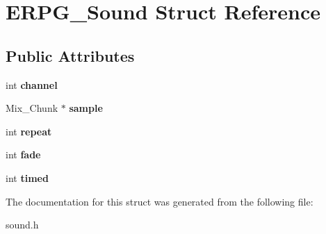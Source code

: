 \hypertarget{structERPG__Sound}{\section{E\-R\-P\-G\-\_\-\-Sound Struct Reference}
\label{structERPG__Sound}
}
\subsection*{Public Attributes}
\begin{DoxyCompactItemize}
\item 
\hypertarget{structERPG__Sound_a93aec5c90887a222294545ea915fd386}{int {\bfseries channel}}\label{structERPG__Sound_a93aec5c90887a222294545ea915fd386}

\item 
\hypertarget{structERPG__Sound_a75cfac9e254c31704f949e7b98308659}{Mix\-\_\-\-Chunk $\ast$ {\bfseries sample}}\label{structERPG__Sound_a75cfac9e254c31704f949e7b98308659}

\item 
\hypertarget{structERPG__Sound_a6e2e04deb422b19d688c24140dc4c66e}{int {\bfseries repeat}}\label{structERPG__Sound_a6e2e04deb422b19d688c24140dc4c66e}

\item 
\hypertarget{structERPG__Sound_a13a475632e7fa2aabadbe369646f17b2}{int {\bfseries fade}}\label{structERPG__Sound_a13a475632e7fa2aabadbe369646f17b2}

\item 
\hypertarget{structERPG__Sound_a0dbf4ae703db9f41e07ed1f3eb04542d}{int {\bfseries timed}}\label{structERPG__Sound_a0dbf4ae703db9f41e07ed1f3eb04542d}

\end{DoxyCompactItemize}


The documentation for this struct was generated from the following file\-:\begin{DoxyCompactItemize}
\item 
sound.\-h\end{DoxyCompactItemize}
